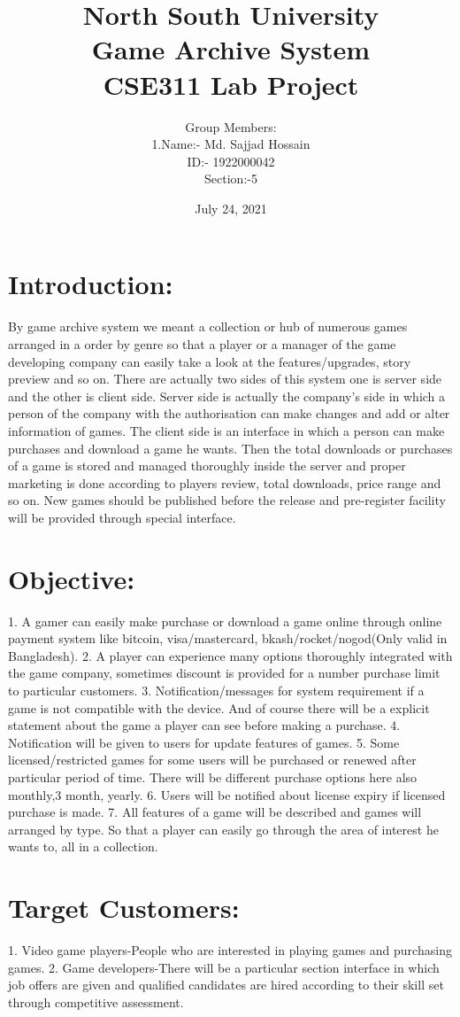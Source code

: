 \documentclass{article}
\title{North South University\\Game Archive System\\CSE311 Lab Project}
\author{Group Members:\\1.Name:- Md. Sajjad Hossain\\ID:- 1922000042\\Section:-5}
\date{July 24, 2021}
\begin{document}
\maketitle

\section{Introduction:} By game archive system we meant a collection or hub of numerous games arranged in a order by genre so that a player or a manager of the game developing company can easily take a look at the features/upgrades, story preview and so on. There are actually two sides of this system one is server side and the other is client side. Server side is actually the company's side in which a person of the company with the authorisation can make changes and add or alter information of games. The client side is an interface in which a person can make purchases and download a game he wants. Then the total downloads or purchases of a game is stored and managed thoroughly inside the server and proper marketing is done according to players review, total downloads, price range and so on. New games should be published before the release and pre-register facility will be provided through special interface.

\section{Objective:}
1. A gamer can easily make purchase or download a game online through online payment system like bitcoin, visa/mastercard, bkash/rocket/nogod(Only valid in Bangladesh).
2. A player can experience many options thoroughly integrated with the game company, sometimes discount is provided for a number purchase limit to particular customers.
3. Notification/messages for system requirement if a game is not compatible with the device. And of course there will be a explicit statement about the game a player can see before making a purchase.
4. Notification will be given to users for update features of games.
5. Some licensed/restricted games for some users will be purchased or renewed after particular period of time. There will be different purchase options here also monthly,3 month, yearly.
6. Users will be notified about license expiry if licensed purchase is made.
7. All features of a game will be described and games will arranged by type. So that a player can easily go through the area of interest he wants to, all in a collection.

\section{Target Customers:}
1. Video game players-People who are interested in playing games and purchasing games.
2. Game developers-There will be a particular section interface in which job offers are given and qualified candidates are hired according to their skill set through competitive assessment.
\end{document}

